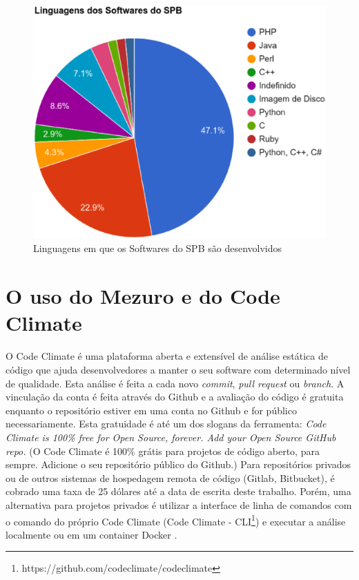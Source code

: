 \begin{figure}[!htb]
	\centering
    \includegraphics[keepaspectratio=true,scale=0.5]
    {figuras/linguagens_softwares_spb_v2.eps}
  \caption{Linguagens em que os Softwares do SPB são desenvolvidos}
  \label{fig:linguagens_softwares_spb_v2}
\end{figure}

\newpage


\section{O uso do Mezuro e do Code Climate}

O Code Climate é uma plataforma aberta e extensível de análise estática de código
que ajuda desenvolvedores a manter o seu software com determinado nível de
qualidade. Esta análise é feita a cada novo \textit{commit},
\textit{pull request} ou \textit{branch}. A vinculação da conta é feita através
do Github e a avaliação do código é gratuita enquanto o repositório estiver em
uma conta no Github e for público necessariamente. Esta gratuidade é até um dos
slogans da ferramenta: \textit{Code Climate is 100\% free for Open Source,
forever. Add your Open Source GitHub repo.} (O Code Climate é 100\% grátis para
projetos de código aberto, para sempre. Adicione o seu repositório público do
Github.) Para repositórios privados ou de outros sistemas de hospedagem remota de
código (Gitlab, Bitbucket), é cobrado uma taxa de 25 dólares até a data de
escrita deste trabalho. Porém, uma alternativa para projetos privados é utilizar
a interface de linha de comandos com o comando do próprio Code Climate (Code
Climate - CLI\footnote{https://github.com/codeclimate/codeclimate}) e executar a
análise localmente ou em um container Docker \cite{codeClimateDoc}.

